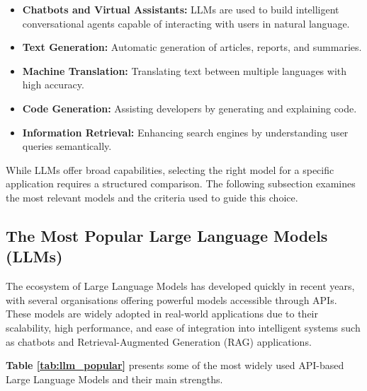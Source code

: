 \begin{itemize}
  \item \textbf{Chatbots and Virtual Assistants:} LLMs are used to build
        intelligent conversational agents capable of interacting with users
        in natural language.
  \item \textbf{Text Generation:} Automatic generation of articles, reports,
        and summaries.
  \item \textbf{Machine Translation:} Translating text between multiple
        languages with high accuracy.
  \item \textbf{Code Generation:} Assisting developers by generating and
        explaining code.
  \item \textbf{Information Retrieval:} Enhancing search engines by
        understanding user queries semantically.
\end{itemize}

While LLMs offer broad capabilities, selecting the right model for a
specific application requires a structured comparison. The following
subsection examines the most relevant models and the criteria used
to guide this choice.


\subsection{The Most Popular Large Language Models (LLMs)}

The ecosystem of Large Language Models has developed quickly in recent years,
with several organisations offering powerful models accessible through APIs.
These models are widely adopted in real-world applications due to their
scalability, high performance, and ease of integration into intelligent
systems such as chatbots and Retrieval-Augmented Generation (RAG) applications.

\textbf{Table \ref{tab:llm_popular}} presents some of the most widely used API-based
Large Language Models and their main strengths.

